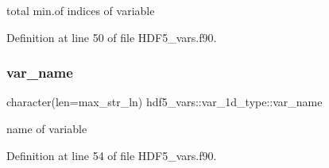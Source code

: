 total min.\+of indices of variable 



Definition at line 50 of file H\+D\+F5\+\_\+vars.\+f90.

\mbox{\label{structhdf5__vars_1_1var__1d__type_a009a09790edf48ec2176bd7fce3abed9}} 
\subsubsection{\texorpdfstring{var\+\_\+name}{var\_name}}
{\footnotesize\ttfamily character(len=max\+\_\+str\+\_\+ln) hdf5\+\_\+vars\+::var\+\_\+1d\+\_\+type\+::var\+\_\+name}



name of variable 



Definition at line 54 of file H\+D\+F5\+\_\+vars.\+f90.



